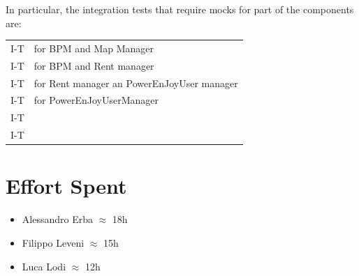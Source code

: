 \documentclass[english]{article}
\begin{document}
In particular, the integration tests that require mocks for part of the components are:
\begin{tabular}{l | p{7cm}}
I-T & for BPM and Map Manager\\ 
I-T & for BPM and Rent manager\\
I-T & for Rent manager an PowerEnJoyUser manager \\
I-T & for PowerEnJoyUserManager\\
I-T & \\
I-T & \\
     
\end{tabular}

\clearpage
\section{Effort Spent} %
	\begin{itemize}
		\item Alessandro Erba $\approx$ 18h
		\item Filippo Leveni 	$\approx$ 15h
		\item Luca Lodi $\approx$ 12h
	\end{itemize}
\end{document}
